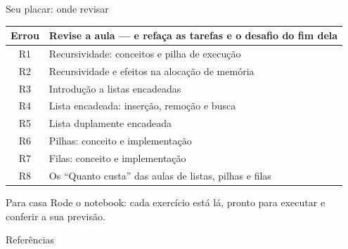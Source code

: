 \documentclass[aspectratio=169]{beamer}
\begin{document}
\begin{frame}{Seu placar: onde revisar}
  \begin{center}
  \small
  \begin{tabular}{@{}cl@{}}
    \toprule
    Errou & Revise a aula --- e refaça as tarefas e o desafio do fim dela \\
    \midrule
    R1 & Recursividade: conceitos e pilha de execução \\
    R2 & Recursividade e efeitos na alocação de memória \\
    R3 & Introdução a listas encadeadas \\
    R4 & Lista encadeada: inserção, remoção e busca \\
    R5 & Lista duplamente encadeada \\
    R6 & Pilhas: conceito e implementação \\
    R7 & Filas: conceito e implementação \\
    R8 & Os ``Quanto custa'' das aulas de listas, pilhas e filas \\
    \bottomrule
  \end{tabular}
  \end{center}
  \begin{block}{Para casa}
    \small Rode o notebook: cada exercício está lá, pronto para executar e
    conferir a sua previsão.
  \end{block}
\end{frame}

\begin{frame}[allowframebreaks]{Referências}
  
  
\end{frame}
\end{document}

